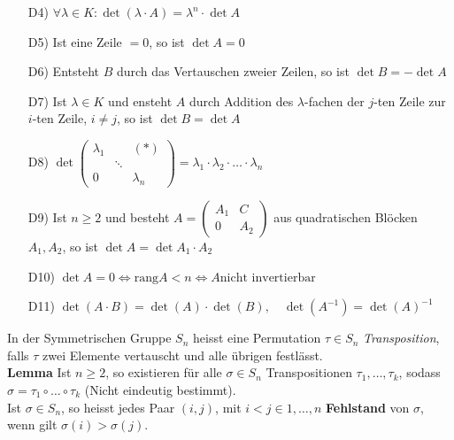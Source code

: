 \begin{mdframed}
\begin{itemize}
    \item[D4)] $\forall \lambda \in K: \det (\lambda \cdot A) = \lambda^n \cdot \det A$
    
    \item[D5)] Ist eine Zeile $= 0$, so ist $\det A = 0$
     
    \item[D6)] Entsteht $B$ durch das Vertauschen zweier Zeilen, so ist $\det B = -\det A$
    
    \item[D7)] Ist $\lambda \in K$ und ensteht $A$ durch Addition des $\lambda$-fachen der $j$-ten Zeile zur $i$-ten Zeile, $i \neq j$, so ist $\det B = \det A$
    
    \item[D8)] $\det \begin{pmatrix}
        \lambda_1 & & (*)\\
         & \ddots & \\
         0 & & \lambda_n
    \end{pmatrix}
    = \lambda_1 \cdot \lambda_2 \cdot \ldots \cdot \lambda_n$

    \item[D9)] Ist $n\geq 2$ und besteht $A = \begin{pmatrix}
        A_1 & C\\
        0 & A_2
    \end{pmatrix}$ aus quadratischen Blöcken $A_1, A_2$, so ist $\det A = \det A_1 \cdot A_2$
    
    \item[D10)] $\det A = 0 \Leftrightarrow \text{rang}A < n \Leftrightarrow A \text{nicht invertierbar}$
    
    \item[D11)] $\det(A\cdot B) = \det(A)\cdot \det(B), \quad \det(A^{-1}) = \det(A)^{-1}$ 
\end{itemize}
\end{mdframed}
In der Symmetrischen Gruppe $S_n$ heisst eine Permutation $\tau \in S_n$ \emph{Transposition}, falls $\tau$ zwei Elemente vertauscht und alle übrigen festlässt.\\
\textbf{Lemma} Ist $n\geq 2$, so existieren für alle $\sigma \in S_n$ Transpositionen $\tau_1, \ldots, \tau_k$, sodass $\sigma = \tau_1 \circ \ldots \circ \tau_k$ (Nicht eindeutig bestimmt).\\
Ist $\sigma \in S_n$, so heisst jedes Paar $(i,j)$, mit $i < j \in {1, \ldots, n}$ \textbf{Fehlstand} von $\sigma$, wenn gilt $\sigma(i) > \sigma(j)$.
